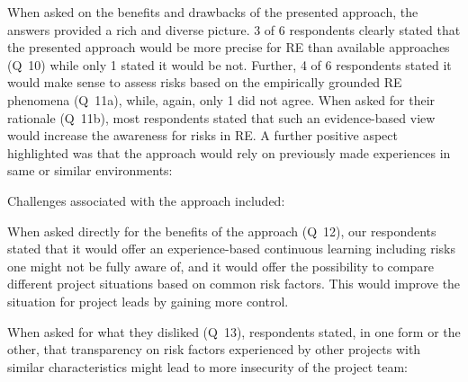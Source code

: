 \documentclass[lnbip]{svmultln}
\begin{document}
When asked on the benefits and drawbacks of the presented approach, the answers provided a rich and diverse picture. 3 of 6 respondents clearly stated that the presented approach would be more precise for RE than available approaches (Q~10) while only 1 stated it would be not. Further, 4 of 6 respondents stated it would make sense to assess risks based on the empirically grounded RE phenomena (Q~11a), while, again, only 1 did not agree. When asked for their rationale (Q~11b), most respondents stated that such an evidence-based view would increase the awareness for risks in RE.  A further positive aspect highlighted was that the approach would rely on previously made experiences in same or similar environments:

\begin{center}
\setlength\fboxsep{0pt}
  \setlength\fboxrule{0pt}
\colorbox{lightgray}{
}
\end{center}

Challenges associated with the approach included: 

\begin{center}
\setlength\fboxsep{0pt}
  \setlength\fboxrule{0pt}
\colorbox{lightgray}{
}
\end{center}

When asked directly for the benefits of the approach (Q~12), our respondents stated that it would offer an experience-based continuous learning including risks one might not be fully aware of, and it would offer the possibility to compare different project situations based on common risk factors. This would improve the situation for project leads by gaining more control.

When asked for what they disliked (Q~13), respondents stated, in one form or the other, that transparency on risk factors experienced by other projects with similar characteristics might lead to more insecurity of the project team:

\begin{center}
\setlength\fboxsep{0pt}
  \setlength\fboxrule{0pt}
\colorbox{lightgray}{
}
\end{center}
\end{document}
